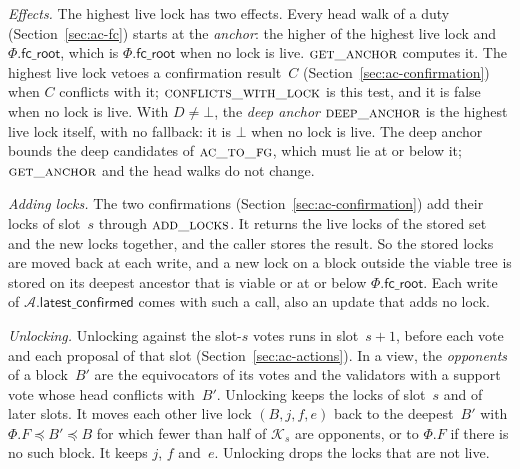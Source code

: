 \documentclass{article}
\newcommand{\committee}{\mathcal K}
\newcommand{\AC}{\mathcal A}
\newcommand{\Fr}{\Phi}
\newcommand{\fcroot}{\mathsf{fc\_root}}
\newcommand{\latestConfirmed}{\mathsf{latest\_confirmed}}
\begin{document}
\emph{Effects.}  The highest live lock has two effects.  Every head walk of a
duty (Section~\ref{sec:ac-fc}) starts at the \emph{anchor}: the higher of the
highest live lock and $\Fr.\fcroot$, which is $\Fr.\fcroot$ when no lock is live.
$\Call{get\_anchor}{}$ computes it.  The highest live lock vetoes a confirmation
result~$C$ (Section~\ref{sec:ac-confirmation}) when $C$ conflicts with it;
$\Call{conflicts\_with\_lock}{}$ is this test, and it is false when no lock is
live.
With $D\neq\bot$, the \emph{deep anchor} $\Call{deep\_anchor}{}$ is the
highest live lock itself, with no fallback: it is $\bot$
when no lock is live.  The deep anchor bounds the deep candidates of
$\Call{ac\_to\_fg}{}$, which must lie at or below it;
$\Call{get\_anchor}{}$ and the head walks do not change.

\emph{Adding locks.}  The two confirmations (Section~\ref{sec:ac-confirmation})
add their locks of slot~$s$ through $\Call{add\_locks}{}$.  It returns the
live locks of the stored set and the new locks together, and the caller
stores the result.  So the stored locks are moved back at each write, and
a new lock on a block outside the viable tree is stored on its deepest
ancestor that is viable or at or below $\Fr.\fcroot$.  Each write of
$\AC.\latestConfirmed$ comes with such a call, also an update that adds no
lock.

\emph{Unlocking.}  Unlocking against the slot-$s$ votes runs in
slot~$s+1$, before each vote and each proposal of that slot
(Section~\ref{sec:ac-actions}).  In a view, the \emph{opponents} of a
block~$B'$ are the equivocators of its votes and the validators with a
support vote whose head conflicts with~$B'$.  Unlocking keeps the locks of
slot~$s$ and of later slots.  It moves each other live lock $(B,j,f,e)$ back
to the deepest~$B'$ with $\Fr.F\preceq B'\preceq B$ for which fewer than
half of $\committee_s$ are opponents, or to $\Fr.F$ if there is no such
block.  It keeps $j$, $f$ and~$e$.  Unlocking drops the locks that are
not live.
\end{document}
